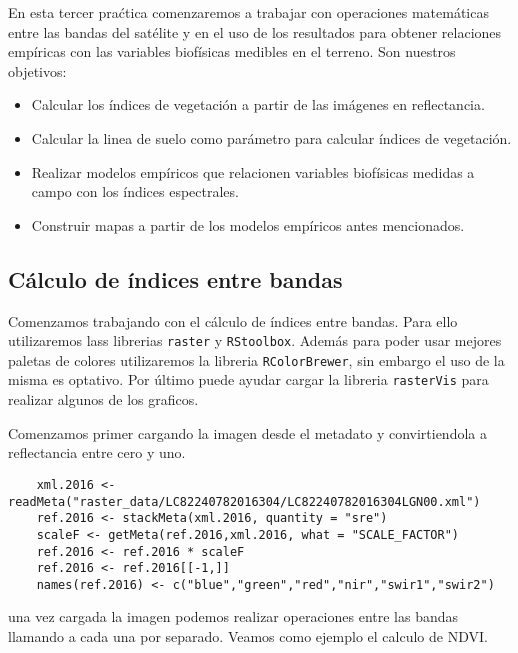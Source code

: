 En esta tercer pra\'ctica comenzaremos a trabajar con operaciones matem\'aticas
entre las bandas del sat\'elite y en el uso de los resultados para obtener
relaciones emp\'iricas con las variables biof\'isicas medibles en el terreno. Son
nuestros objetivos:

\begin{itemize}
    \item Calcular los \'indices de vegetaci\'on a partir de las im\'agenes en
        reflectancia.
    \item Calcular la linea de suelo como par\'ametro para calcular \'indices
        de vegetaci\'on.
    \item Realizar modelos emp\'iricos que relacionen variables biof\'isicas
        medidas a campo con los \'indices espectrales.
    \item Construir mapas a partir de los modelos emp\'iricos antes mencionados.
\end{itemize}


\subsection{C\'alculo de \'indices entre bandas}
Comenzamos trabajando con el c\'alculo de \'indices entre bandas. Para ello
utilizaremos lass librerias \texttt{raster} y \texttt{RStoolbox}. Adem\'as para
poder usar mejores paletas de colores utilizaremos la libreria
\texttt{RColorBrewer}, sin embargo el uso de la misma es optativo. Por \'ultimo
puede ayudar cargar la libreria \texttt{rasterVis} para realizar algunos de los
graficos.

Comenzamos primer cargando la imagen desde el metadato y convirtiendola a
reflectancia entre cero y uno.

\begin{lstlisting}
    xml.2016 <- readMeta("raster_data/LC82240782016304/LC82240782016304LGN00.xml")
    ref.2016 <- stackMeta(xml.2016, quantity = "sre")
    scaleF <- getMeta(ref.2016,xml.2016, what = "SCALE_FACTOR")
    ref.2016 <- ref.2016 * scaleF
    ref.2016 <- ref.2016[[-1,]]
    names(ref.2016) <- c("blue","green","red","nir","swir1","swir2")
\end{lstlisting}

una vez cargada la imagen podemos realizar operaciones entre las bandas llamando
a cada una por separado. Veamos como ejemplo el calculo de NDVI\@.


